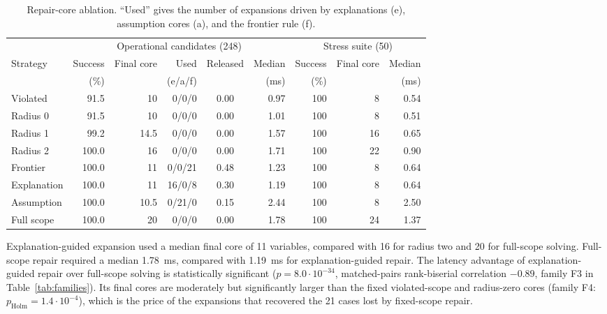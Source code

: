 \documentclass[pdflatex,sn-mathphys-num,iicol,oneside]{sn-jnl}
\begin{document}
\begin{table}[t]
\centering
\caption{
Repair-core ablation. ``Used'' gives the number of expansions driven
by explanations (e), assumption cores (a), and the frontier rule (f).
}
\label{tab:repair-results}
\setlength{\tabcolsep}{5pt}
\small

\begin{tabular}{lrrrcr@{\hspace{7pt}}rrr}
\toprule
&
\multicolumn{5}{c}{Operational candidates (248)}
&
\multicolumn{3}{c}{Stress suite (50)}
\\
\cmidrule(r){2-6}
\cmidrule(l){7-9}

Strategy &
Success &
Final core &
Used &
Released &
Median &
Success &
Final core &
Median\\
&
(\%) &
&
(e/a/f) &
&
(ms) &
(\%) &
&
(ms)\\
\midrule

Violated
& 91.5 & 10 & 0/0/0 & 0.00 & 0.97
& 100 & 8 & 0.54\\

Radius 0
& 91.5 & 10 & 0/0/0 & 0.00 & 1.01
& 100 & 8 & 0.51\\

Radius 1
& 99.2 & 14.5 & 0/0/0 & 0.00 & 1.57
& 100 & 16 & 0.65\\

Radius 2
& 100.0 & 16 & 0/0/0 & 0.00 & 1.71
& 100 & 22 & 0.90\\

Frontier
& 100.0 & 11 & 0/0/21 & 0.48 & 1.23
& 100 & 8 & 0.64\\

Explanation
& 100.0 & 11 & 16/0/8 & 0.30 & 1.19
& 100 & 8 & 0.64\\

Assumption
& 100.0 & 10.5 & 0/21/0 & 0.15 & 2.44
& 100 & 8 & 2.50\\

Full scope
& 100.0 & 20 & 0/0/0 & 0.00 & 1.78
& 100 & 24 & 1.37\\

\bottomrule
\end{tabular}
\normalsize
\end{table}

Explanation-guided expansion used a median final core of 11 variables,
compared with 16 for radius two and 20 for full-scope solving.
Full-scope repair required a median 1.78~ms, compared with 1.19~ms for
explanation-guided repair. The latency advantage of explanation-guided repair over full-scope solving is statistically significant ($p=8.0\cdot 10^{-34}$, matched-pairs rank-biserial correlation $-0.89$, family F3 in Table~\ref{tab:families}). Its final cores are moderately but significantly larger than the fixed violated-scope and radius-zero cores (family F4: $p_{\mathrm{Holm}}=1.4\cdot 10^{-4}$), which is the price of the expansions that recovered the 21 cases lost by fixed-scope repair.
\end{document}
